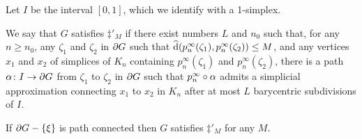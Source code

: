 \documentclass[a4paper]{article}
\begin{document}
\begin{definition}
  Let $I$ be the interval $[0,1]$, which we identify with a 1-simplex.  

  We say that $G$ satisfies $\ddag'_M$ if there exist numbers $L$ and $n_0$
  such that, for any $n \geq n_0$, any $\zeta_1$ and $\zeta_2$ in $\partial G$
  such that $\operatorname{\widehat{d}}(p^\infty_n(\zeta_1), p^\infty_n(\zeta_2)) \leq M$, and
  any vertices $x_1$ and $x_2$ of simplices of $K_n$ containing
  $p^\infty_n(\zeta_1)$ and $p^\infty_n(\zeta_2)$, there is a path $\alpha\colon
  I\to \partial G$ from $\zeta_1$ to $\zeta_2$ in $\partial G$ such that
  $p^\infty_n\circ\alpha$ admits a simplicial approximation connecting
  $x_1$ to $x_2$ in $K_n$ after at most $L$ barycentric subdivisions of $I$.
\end{definition}

\begin{proposition}
  If $\partial G - \left\{\xi\right\}$ is path connected then $G$ satisfies $\ddag'_M$
  for any $M$.
\end{proposition}
\end{document}
